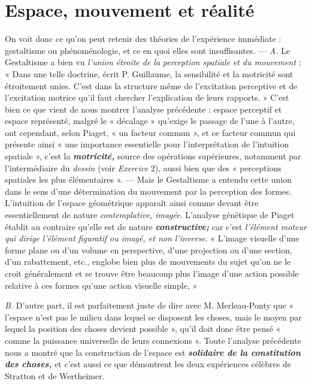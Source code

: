 \section{Espace, mouvement et réalité}%
On voit donc ce qu’on
peut retenir des théories de l'expérience immédiate : gestaltisme ou
phénoménologie, et ce en quoi elles sont insuffisantes. — {\it A.} Le
Gestaltisme a bien vu {\it l'union étroite de la perception spatiale et du
mouvement} : « Dans une telle doctrine, écrit P. Guillaume, la sensibilité
et la motricité sont étroitement unies. C’est dans la structure
même de l’excitation perceptive et de l’excitation motrice qu’il faut
chercher l’explication de leurs rapports. » C'est bien ce que vient de
nous montrer l’analyse précédente : espace perceptif et espace représenté,
malgré le « décalage » qu’exige le passage de l’une à l’autre, ont
cependant, selon Piaget, « un facteur commun », et ce facteur commun
qui présente ainsi « une importance essentielle pour l’interprétation
de l'intuition spatiale », c’est la \textbf{\textit {motricité,}} source des opérations
supérieures, notamment par l'intermédiaire du {\it dessin} (voir
{\it Exercice} 2), aussi bien que des « perceptions spatiales les plus élémentaires ».
— Mais le Gestaltisme a entendu cette union dans le
sens d’une détermination du mouvement par la perception des formes.
L’intuition de l’espace géométrique apparaît ainsi comme devant
être essentiellement de nature {\it contemplative, imagée}. L’analyse génétique
de Piaget établit au contraire qu’elle est de nature \textbf{\textit {constructive;}}
car c’est {\it l'élément moteur qui dirige l'élément figuratif ou imagé, et
non l'inverse}. « L’image visuelle d’une forme plane ou d’un volume en
perspective, d’une projection ou d’une section, d’un rabattement, etc.,
englobe bien plus de mouvements du sujet qu’on ne le croit généralement
et se trouve être beaucoup plus l’image d’une action possible
relative à ces formes qu’une action visuelle simple, »

{\it B.} D’autre part, il est parfaitement juste de dire avec M. Merleau-Ponty
que « l’espace n’est pas le milieu dans lequel se disposent les
choses, mais le moyen par lequel la position des choses devient possible »,
qu’il doit donc être pensé « comme la puissance universelle
de leurs connexions ». Toute l’analyse précédente nous a montré que
la construction de l’espace est \textbf{\textit {solidaire de la constitution des choses,}}
et c’est aussi ce que démontrent les deux expériences célèbres de
Stratton et de Wertheimer.

